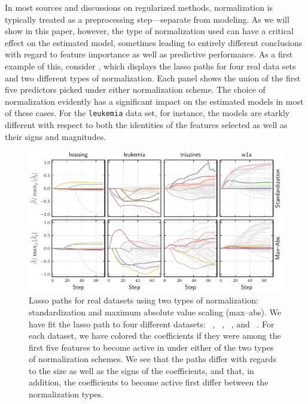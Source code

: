 In most sources and discussions on regularized methods, normalization is typically treated
as a preprocessing step---separate from modeling. As we will show in this paper, however,
the type of normalization used can have a critical effect on the estimated model, sometimes
leading to entirely different conclusions with regard to feature importance as well as
predictive performance. As a first example of this, consider ,
which displays the lasso paths for four real data sets and two different types of
normalization. Each panel shows the union of the first five predictors picked under either
normalization scheme. The choice of normalization evidently has a significant impact on the
estimated models in most of these cases. For the \texttt{leukemia} data set, for instance,
the models are starkly different with respect to both the identities of the features
selected as well as their signs and magnitudes.

\begin{figure}[bpt]
  \centering
  \includegraphics[]{plots/realdata_paths.pdf}
  \caption{%
    Lasso paths for real datasets using two types of normalization: standardization and maximum absolute value scaling (max--abs). We have fit the lasso path to four different datasets: ~\citep{harrison1978}, ~\citep{golub1999}, ~\citep{king}, and ~\citep{platt1998}. For each dataset, we have colored the coefficients if they were among the first five features to become active in under either of the two types of normalization schemes. We see that the paths differ with regards to the size as well as the signs of the coefficients, and that, in addition, the coefficients to become active first differ between the normalization types.
  }
  \label{fig:realdata-paths}
\end{figure}

